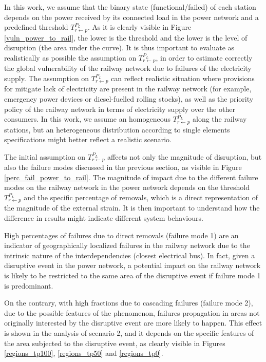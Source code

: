 \documentclass[review]{elsarticle}
\begin{document}
	In this work, we assume that the binary state (functional/failed) of each station depends on the power received by its connected load in the power network and a predefined threshold $T_{r \leftarrow p}^{P_L}$. As it is clearly visible in Figure \ref{vuln_power_to_rail}, the lower is the threshold and the lower is the level of disruption (the area under the curve). It is thus important to evaluate as realistically as possible the assumption on $T_{r \leftarrow p}^{P_L}$, in order to estimate correctly the global vulnerability of the railway network due to failures of the electricity supply. The assumption on $T_{r \leftarrow p}^{P_L}$ can reflect realistic situation where provisions for mitigate lack of electricity are present in the railway network (for example, emergency power devices or diesel-fuelled rolling stocks), as well as the priority policy of the railway network in terms of electricity supply over the other consumers. In this work, we assume an homogeneous $T_{r \leftarrow p}^{P_L}$ along the railway stations, but an heterogeneous distribution according to single elements specifications might better reflect a realistic scenario.

	The initial assumption on $T_{r \leftarrow p}^{P_L}$ affects not only the magnitude of disruption, but also the failure modes discussed in the previous section, as visible in Figure \ref{perc_fail_power_to_rail}. The magnitude of impact due to the different failure modes on the railway network in the power network depends on the threshold $T_{r \leftarrow p}^{P_L}$ and the specific percentage of removals, which is a direct representation of the magnitude of the external strain. It is then important to understand how the difference in results might indicate different system behaviours.
	
	High percentages of failures due to direct removals (failure mode 1) are an indicator of geographically localized failures in the railway network due to the intrinsic nature of the interdependencies (closest electrical bus). In fact, given a disruptive event in the power network, a potential impact on the railway network is likely to be restricted to the same area of the disruptive event if failure mode 1 is predominant.
	
	On the contrary, with high fractions due to cascading failures (failure mode 2), due to the possible  features of the phenomenon, failures propagation in areas not originally interested by the disruptive event are more likely to happen. This effect is shown in the analysis of scenario 2, and it depends on the specific features of the area subjected to the disruptive event, as clearly visible in Figures \ref{regions_tp100}, \ref{regions_tp50} and \ref{regions_tp0}. 
	
\end{document}
